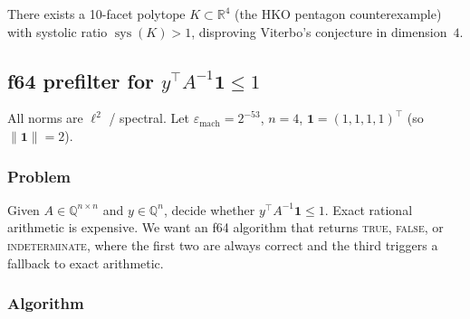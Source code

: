 
\begin{unverified}
\begin{theorem}%
\label{thm:hko-counterexample}
There exists a 10-facet polytope $K \subset \mathbb{R}^4$
(the HKO pentagon counterexample) with systolic ratio
$\operatorname{sys}(K) > 1$, disproving Viterbo's conjecture
in dimension~$4$.
\end{theorem}
\end{unverified}



\providecommand{\one}{\mathbf{1}}
\providecommand{\emach}{\varepsilon_{\mathrm{mach}}}

\subsection{f64 prefilter for $y^\top A^{-1}\one \le 1$}

All norms are $\ell^2$ / spectral.
Let $\emach = 2^{-53}$, $n = 4$, $\one = (1,1,1,1)^\top$
(so $\|\one\| = 2$).

\subsubsection*{Problem}

Given $A \in \mathbb{Q}^{n \times n}$ and $y \in \mathbb{Q}^n$,
decide whether $y^\top A^{-1}\one \le 1$.
Exact rational arithmetic is expensive.
We want an f64 algorithm that returns
\textsc{true}, \textsc{false}, or \textsc{indeterminate},
where the first two are always correct and the third
triggers a fallback to exact arithmetic.

\subsubsection*{Algorithm}

